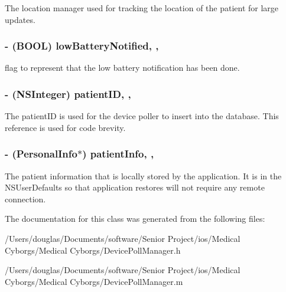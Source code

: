 The location manager used for tracking the location of the patient for large updates. \hypertarget{interface_device_poll_manager_a265079b7aa0e9cc69818fb49835bd175}{
\subsubsection[{low\-Battery\-Notified}]{\setlength{\rightskip}{0pt plus 5cm}-\/ (B\-O\-O\-L) low\-Battery\-Notified\hspace{0.3cm}{\ttfamily [read]}, {\ttfamily [write]}, {\ttfamily [atomic]}}}\label{interface_device_poll_manager_a265079b7aa0e9cc69818fb49835bd175}
flag to represent that the low battery notification has been done. \hypertarget{interface_device_poll_manager_a621e3962372201145248997e2eb87327}{
\subsubsection[{patient\-I\-D}]{\setlength{\rightskip}{0pt plus 5cm}-\/ (N\-S\-Integer) patient\-I\-D\hspace{0.3cm}{\ttfamily [read]}, {\ttfamily [write]}, {\ttfamily [atomic]}}}\label{interface_device_poll_manager_a621e3962372201145248997e2eb87327}
The patient\-I\-D is used for the device poller to insert into the database. This reference is used for code brevity. \hypertarget{interface_device_poll_manager_a8739ffcaa2b1e02afc1864e338de148f}{
\subsubsection[{patient\-Info}]{\setlength{\rightskip}{0pt plus 5cm}-\/ ({\bf Personal\-Info}$\ast$) patient\-Info\hspace{0.3cm}{\ttfamily [read]}, {\ttfamily [write]}, {\ttfamily [atomic]}}}\label{interface_device_poll_manager_a8739ffcaa2b1e02afc1864e338de148f}
The patient information that is locally stored by the application. It is in the N\-S\-User\-Defaults so that application restores will not require any remote connection. 

The documentation for this class was generated from the following files\-:\begin{DoxyCompactItemize}
\item 
/\-Users/douglas/\-Documents/software/\-Senior Project/ios/\-Medical Cyborgs/\-Medical Cyborgs/Device\-Poll\-Manager.\-h\item 
/\-Users/douglas/\-Documents/software/\-Senior Project/ios/\-Medical Cyborgs/\-Medical Cyborgs/Device\-Poll\-Manager.\-m\end{DoxyCompactItemize}
